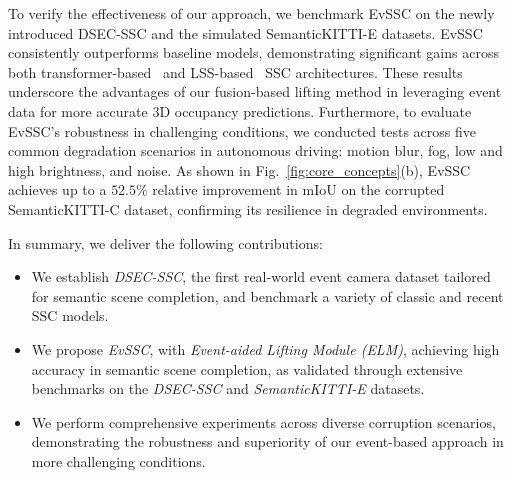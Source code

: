 To verify the effectiveness of our approach, we benchmark EvSSC on the newly introduced DSEC-SSC and the simulated SemanticKITTI-E datasets. 
EvSSC consistently outperforms baseline models, demonstrating significant gains across both transformer-based~\cite{li2023voxformer} and LSS-based~\cite{mei2024sgn} SSC architectures. 
These results underscore the advantages of our fusion-based lifting method in leveraging event data for more accurate 3D occupancy predictions.
Furthermore, to evaluate EvSSC’s robustness in challenging conditions, we conducted tests across five common degradation scenarios in autonomous driving: motion blur, fog, low and high brightness, and noise. 
%
As shown in Fig.~\ref{fig:core_concepts}(b), EvSSC achieves up to a $52.5\%$ relative improvement in mIoU on the corrupted SemanticKITTI-C dataset, confirming its resilience in degraded environments.

In summary, we deliver the following contributions:
\begin{itemize}
    \item We establish \emph{DSEC-SSC}, the first real-world event camera dataset tailored for semantic scene completion, and benchmark a variety of classic and recent SSC models.
    \item We propose \emph{EvSSC}, with \emph{Event-aided Lifting Module (ELM)}, achieving high accuracy in semantic scene completion, as validated through extensive benchmarks on the \emph{DSEC-SSC} and \emph{SemanticKITTI-E} datasets.
    \item We perform comprehensive experiments across diverse corruption scenarios, demonstrating the robustness and superiority of our event-based approach in more challenging conditions.
\end{itemize}

%
